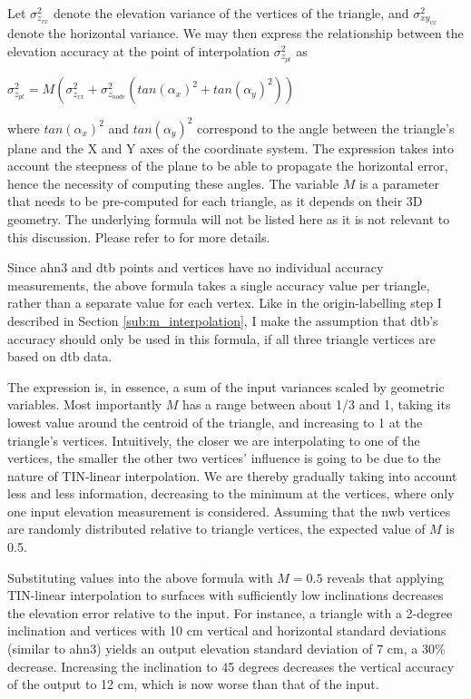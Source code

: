 Let $\sigma_{z_{vx}}^{2}$ denote the elevation variance of the vertices of the triangle, and $\sigma_{xy_{vx}}^{2}$ denote the horizontal variance. We may then express the relationship between the elevation accuracy at the point of interpolation $\sigma_{z_{pt}}^{2}$ as

$\sigma_{z_{pt}}^{2} = M\left(\sigma_{z_{vx}}^{2} + \sigma_{z_{node}}^{2}\left(tan\left(\alpha_x\right)^2 + tan\left(\alpha_y\right)^2\right)\right)$

where $tan\left(\alpha_x\right)^2$ and $tan\left(\alpha_y\right)^2$ correspond to the angle between the triangle's plane and the X and Y axes of the coordinate system. The expression takes into account the steepness of the plane to be able to propagate the horizontal error, hence the necessity of computing these angles. The variable $M$ is a parameter that needs to be pre-computed for each triangle, as it depends on their 3D geometry. The underlying formula will not be listed here as it is not relevant to this discussion. Please refer to \cite{fan_etal_2014} for more details.

Since \ac{ahn3} and \ac{dtb} points and vertices have no individual accuracy measurements, the above formula takes a single accuracy value per triangle, rather than a separate value for each vertex. Like in the origin-labelling step I described in Section \ref{sub:m_interpolation}, I make the assumption that \ac{dtb}'s accuracy should only be used in this formula, if all three triangle vertices are based on \ac{dtb} data.

The expression is, in essence, a sum of the input variances scaled by geometric variables. Most importantly $M$ has a range between about 1/3 and 1, taking its lowest value around the centroid of the triangle, and increasing to 1 at the triangle's vertices. Intuitively, the closer we are interpolating to one of the vertices, the smaller the other two vertices' influence is going to be due to the nature of TIN-linear interpolation. We are thereby gradually taking into account less and less information, decreasing to the minimum at the vertices, where only one input elevation measurement is considered. Assuming that the \ac{nwb} vertices are randomly distributed relative to triangle vertices, the expected value of $M$ is 0.5.

Substituting values into the above formula with $M=0.5$ reveals that applying TIN-linear interpolation to surfaces with sufficiently low inclinations decreases the elevation error relative to the input. For instance, a triangle with a 2-degree inclination and vertices with 10 cm vertical and horizontal standard deviations (similar to \ac{ahn3}) yields an output elevation standard deviation of 7 cm, a 30\% decrease. Increasing the inclination to 45 degrees decreases the vertical accuracy of the output to 12 cm, which is now worse than that of the input.

